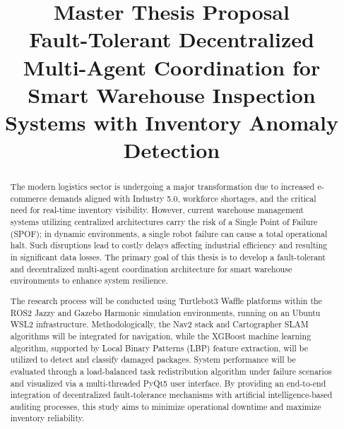 \documentclass[conference]{IEEEtran}
\begin{document}
\raggedbottom

\title{
Master Thesis Proposal\\
Fault-Tolerant Decentralized Multi-Agent Coordination for Smart Warehouse Inspection Systems with Inventory Anomaly Detection
}


\author{
}

\maketitle

\begin{abstract}

The modern logistics sector is undergoing a major transformation due to increased e-commerce demands aligned with Industry 5.0, workforce shortages, and the critical need for real-time inventory visibility. However, current warehouse management systems utilizing centralized architectures carry the risk of a Single Point of Failure (SPOF); in dynamic environments, a single robot failure can cause a total operational halt. Such disruptions lead to costly delays affecting industrial efficiency and resulting in significant data losses. The primary goal of this thesis is to develop a fault-tolerant and decentralized multi-agent coordination architecture for smart warehouse environments to enhance system resilience.

The research process will be conducted using Turtlebot3 Waffle platforms within the ROS2 Jazzy and Gazebo Harmonic simulation environments, running on an Ubuntu WSL2 infrastructure. Methodologically, the Nav2 stack and Cartographer SLAM algorithms will be integrated for navigation, while the XGBoost machine learning algorithm, supported by Local Binary Patterns (LBP) feature extraction, will be utilized to detect and classify damaged packages. System performance will be evaluated through a load-balanced task redistribution algorithm under failure scenarios and visualized via a multi-threaded PyQt5 user interface. By providing an end-to-end integration of decentralized fault-tolerance mechanisms with artificial intelligence-based auditing processes, this study aims to minimize operational downtime and maximize inventory reliability.

\end{abstract}
\end{document}
